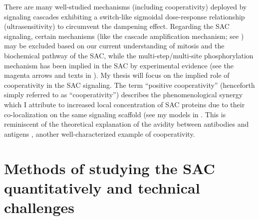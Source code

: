 There are many well-studied mechanisms (including cooperativity) deployed by signaling cascades exhibiting a switch-like sigmoidal dose-response relationship (ultrasensitivity) to circumvent the dampening effect. Regarding the SAC signaling, certain mechanisms (like the cascade amplification mechanism; see ) may be excluded based on our current understanding of mitosis and the biochemical pathway of the SAC, while the multi-step/multi-site phosphorylation mechanism has been implied in the SAC by experimental evidence \cite{MultistepUltrasensitivity, Ji2017eLife} (see the magenta arrows and texts in ). My thesis will focus on the implied role of cooperativity in the SAC signaling. The term ``positive cooperativity'' (henceforth simply referred to as ``cooperativity'') describes the phenomenological synergy which I attribute to increased local concentration of SAC proteins due to their co-localization on the same signaling scaffold (see my models in . This is reminiscent of the theoretical explanation of the avidity between antibodies and antigens \cite{AvidityMath}, another well-characterized example of cooperativity.

\section{Methods of studying the SAC quantitatively  and technical challenges}

